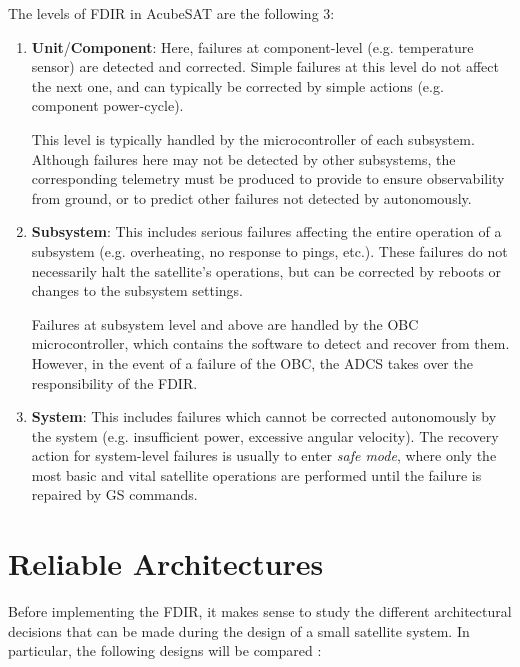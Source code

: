 \documentclass[a4paper,nobib]{tufte-book}
\begin{document}
The levels of \acs{FDIR} in AcubeSAT are the following 3:
\begin{enumerate}[label=Level \arabic*]
	\item \textbf{Unit}/\textbf{Component}: Here, failures at component-level (e.g. temperature sensor) are detected and corrected. Simple failures at this level do not affect the next one, and can typically be corrected by simple actions (e.g. component power-cycle).
	
	This level is typically handled by the microcontroller of each subsystem. Although failures here may not be detected by other subsystems, the corresponding telemetry must be produced to provide to ensure observability from ground, or to predict other failures not detected by autonomously.
	\item \textbf{Subsystem}: This includes serious failures affecting the entire operation of a subsystem (e.g. overheating, no response to pings, etc.). These failures do not necessarily halt the satellite's operations, but can be corrected by reboots or changes to the subsystem settings.
	
	Failures at subsystem level and above are handled by the \acf{OBC} microcontroller, which contains the software to detect and recover from them. However, in the event of a failure of the \acs{OBC}, the \ac{ADCS} takes over the responsibility of the \acs{FDIR}.
	\item \textbf{System}: This includes failures which cannot be corrected au\-to\-nom\-ous\-ly by the system (e.g. insufficient power, excessive angular velocity). The recovery action for system-level failures is usually to enter \emph{safe mode}, where only the most basic and vital satellite operations are performed until the failure is repaired by \acl{GS} commands.
\end{enumerate}

\section{Reliable Architectures}
\label{sec:theoretical}

Before implementing the \acs{FDIR}, it makes sense to study the different architectural decisions that can be made during the design of a small satellite system. In particular, the following designs will be compared \autocite{birolini_reliability_engineering_2004}:
\end{document}
